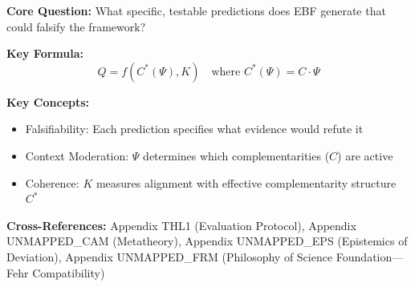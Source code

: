 
\begin{abstract}
A framework that can explain everything explains nothing. This appendix addresses the Popperian challenge by deriving ten specific, falsifiable predictions from the EBF $(C, \Psi, C^*, K, Q)$ framework. Each prediction specifies the direction and magnitude of effects, identifies what evidence would refute it, and provides concrete empirical tests. Topics include cash transfer effectiveness, management practice transfer, information intervention asymmetry, financial-political crisis lags, recovery convexity, trade war hysteresis, technology-culture divergence, multi-level coherence conflicts, identity-economics non-substitutability, and coherent traps.
\end{abstract}


\begin{tcolorbox}[colback=blue!5!white, colframe=blue!75!black,
    title=Quick Reference: Falsifiable Predictions]

\textbf{Core Question:} What specific, testable predictions does EBF generate that could falsify the framework?

\textbf{Key Formula:}
\begin{equation}
Q = f(C^*(\Psi), K) \quad \text{where } C^*(\Psi) = C \cdot \Psi
\end{equation}

\textbf{Key Concepts:}
\begin{itemize}[nosep]
\item Falsifiability: Each prediction specifies what evidence would refute it
\item Context Moderation: $\Psi$ determines which complementarities ($C$) are active
\item Coherence: $K$ measures alignment with effective complementarity structure $C^*$
\end{itemize}

\textbf{Cross-References:} Appendix THL1 (Evaluation Protocol), Appendix UNMAPPED_CAM (Metatheory), Appendix UNMAPPED_EPS (Epistemics of Deviation), Appendix UNMAPPED_FRM (Philosophy of Science Foundation---Fehr Compatibility)
\end{tcolorbox}

